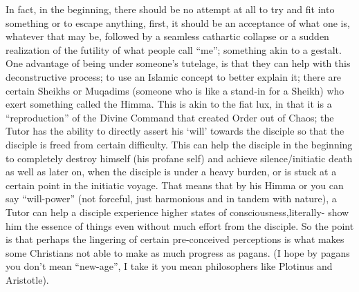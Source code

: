 \begin{footnotesize}
\begin{sffamily}
In fact, in the beginning, there should be no attempt at all to try and fit into something or to escape anything, first, it should be an acceptance of what one is, whatever that may be, followed by a seamless cathartic collapse or a sudden realization of the futility of what people call ``me''; something akin to a gestalt. One advantage of being under someone's tutelage, is that they can help with this deconstructive process; to use an Islamic concept to better explain it; there are certain Sheikhs or Muqadims (someone who is like a stand-in for a Sheikh) who exert something called the Himma. This is akin to the fiat lux, in that it is a ``reproduction'' of the Divine Command that created Order out of Chaos; the Tutor has the ability to directly assert his `will' towards the disciple so that the disciple is freed from certain difficulty. This can help the disciple in the beginning to completely destroy himself (his profane self) and achieve silence/initiatic death as well as later on, when the disciple is under a heavy burden, or is stuck at a certain point in the initiatic voyage. That means that by his Himma or you can say ``will-power'' (not forceful, just harmonious and in tandem with nature), a Tutor can help a disciple experience higher states of consciousness,literally- show him the essence of things even without much effort from the disciple. So the point is that perhaps the lingering of certain pre-conceived perceptions is what makes some Christians not able to make as much progress as pagans. (I hope by pagans you don't mean ``new-age'', I take it you mean philosophers like Plotinus and Aristotle).

\end{sffamily}
\end{footnotesize}

